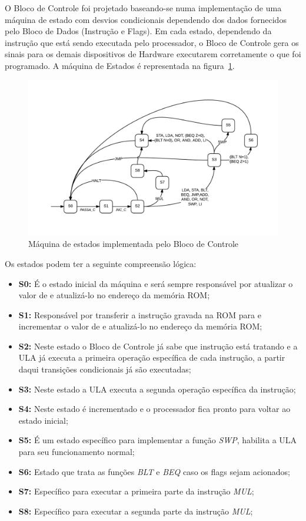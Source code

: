 \documentclass[../main.tex]{subfiles}
\begin{document}
		O Bloco de Controle foi projetado baseando-se numa implementação de uma máquina de estado com desvios condicionais dependendo dos dados fornecidos pelo Bloco de Dados (Instrução e Flags).
		Em cada estado, dependendo da instrução que está sendo executada pelo processador, o Bloco de Controle gera os sinais para os demais dispositivos de Hardware executarem corretamente o que foi programado.
		A máquina de Estados é representada na figura~\ref{fig:maquina_estados}.
		
		\begin{figure}[h]
			\centering
			\includegraphics[width=\textwidth]{img/bloco_controle}
			\caption{Máquina de estados implementada pelo Bloco de Controle}
			\label{fig:maquina_estados}
		\end{figure}
		
		Os estados podem ter a seguinte compreensão lógica:
		\begin{itemize}
			\item \textbf{S0:} É o estado inicial da máquina e será sempre responsável por atualizar o valor de \PC{} e atualizá-lo no endereço da memória ROM;
			\item \textbf{S1:} Responsável por transferir a instrução gravada na ROM para \IR{} e incrementar o valor de \PC{} e atualizá-lo no endereço da memória ROM;
			\item \textbf{S2:} Neste estado o Bloco de Controle já sabe que instrução está tratando e a ULA já executa a primeira operação específica de cada instrução, a partir daqui transições condicionais já são executadas;
			\item \textbf{S3:} Neste estado a ULA executa a segunda operação específica da instrução;
			\item \textbf{S4:} Neste estado \PC{} é incrementado e o processador fica pronto para voltar ao estado inicial;
			\item \textbf{S5:} É um estado específico para implementar a função \textit{SWP}, habilita a ULA para seu funcionamento normal;
			\item \textbf{S6:} Estado que trata as funções \textit{BLT} e \textit{BEQ} caso os flags sejam acionados;
			\item \textbf{S7:} Específico para executar a primeira parte da instrução \textit{MUL};
			\item \textbf{S8:} Específico para executar a segunda parte da instrução \textit{MUL};			
		\end{itemize}
\end{document}
